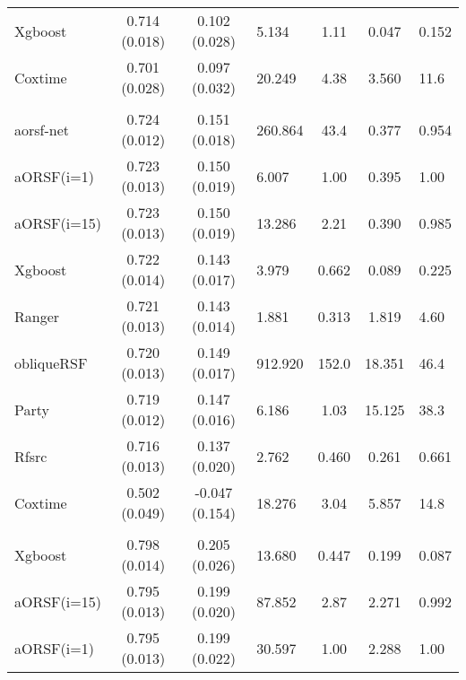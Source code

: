 \documentclass[twoside,11pt]{article}\usepackage[]{graphicx}\usepackage[]{color}
\newenvironment{knitrout}{}{} %
\begin{document}
\begin{knitrout}
\begin{longtable}{lcclccl}
\hspace{1em}Xgboost & 0.714 (0.018) & 0.102 (0.028) & 5.134 & 1.11 & 0.047 & 0.152\\
\hspace{1em}Coxtime & 0.701 (0.028) & 0.097 (0.032) & 20.249 & 4.38 & 3.560 & 11.6\\
\addlinespace[0.3em]
\hline
\multicolumn{7}{l}{\textit{\textbf{Rotterdam Breast Cancer Data, N = 2,982}}}\\
\hline
\hspace{1em}aorsf-net & 0.724 (0.012) & 0.151 (0.018) & 260.864 & 43.4 & 0.377 & 0.954\\
\hspace{1em}aORSF(i=1) & 0.723 (0.013) & 0.150 (0.019) & 6.007 & 1.00 & 0.395 & 1.00\\
\hspace{1em}aORSF(i=15) & 0.723 (0.013) & 0.150 (0.019) & 13.286 & 2.21 & 0.390 & 0.985\\
\hspace{1em}Xgboost & 0.722 (0.014) & 0.143 (0.017) & 3.979 & 0.662 & 0.089 & 0.225\\
\hspace{1em}Ranger & 0.721 (0.013) & 0.143 (0.014) & 1.881 & 0.313 & 1.819 & 4.60\\
\hspace{1em}obliqueRSF & 0.720 (0.013) & 0.149 (0.017) & 912.920 & 152.0 & 18.351 & 46.4\\
\hspace{1em}Party & 0.719 (0.012) & 0.147 (0.016) & 6.186 & 1.03 & 15.125 & 38.3\\
\hspace{1em}Rfsrc & 0.716 (0.013) & 0.137 (0.020) & 2.762 & 0.460 & 0.261 & 0.661\\
\hspace{1em}Coxtime & 0.502 (0.049) & -0.047 (0.154) & 18.276 & 3.04 & 5.857 & 14.8\\
\addlinespace[0.3em]
\hline
\multicolumn{7}{l}{\textit{\textbf{sprint-acm}}}\\
\hline
\hspace{1em}Xgboost & 0.798 (0.014) & 0.205 (0.026) & 13.680 & 0.447 & 0.199 & 0.087\\
\hspace{1em}aORSF(i=15) & 0.795 (0.013) & 0.199 (0.020) & 87.852 & 2.87 & 2.271 & 0.992\\
\hspace{1em}aORSF(i=1) & 0.795 (0.013) & 0.199 (0.022) & 30.597 & 1.00 & 2.288 & 1.00\\

\end{longtable}
\end{knitrout}
\end{document}
